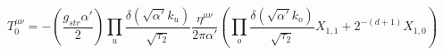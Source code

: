 \begin{equation}
T^{\mu\nu}_0=-\left(\frac{g_{str}\alpha'}{2}\right)
\prod_u\frac{\delta(\sqrt{\alpha'}k_u)}{\sqrt{\tau_2}}
\frac{\eta^{\mu\nu}}{ 2\pi\alpha'}
\left( \prod_o \frac{\delta(\sqrt{\alpha'}k_o)}{\sqrt{\tau_2}}
X_{1,1}+2^{-(d+1)}X_{1,0}\right)
\end{equation}

